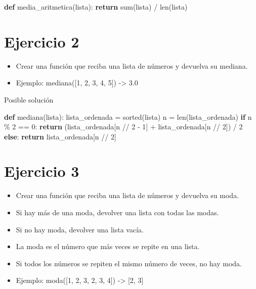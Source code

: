 \documentclass[
  a4paper,
  DIV=11,
  numbers=noendperiod,
  onepage,
  openany]{scrreprt}
\newenvironment{Shaded}{\begin{snugshade}}{\end{snugshade}}
\newcommand{\BuiltInTok}[1]{\textcolor[rgb]{0.00,0.23,0.31}{#1}}
\newcommand{\ControlFlowTok}[1]{\textcolor[rgb]{0.00,0.23,0.31}{\textbf{#1}}}
\newcommand{\DecValTok}[1]{\textcolor[rgb]{0.68,0.00,0.00}{#1}}
\newcommand{\KeywordTok}[1]{\textcolor[rgb]{0.00,0.23,0.31}{\textbf{#1}}}
\newcommand{\NormalTok}[1]{\textcolor[rgb]{0.00,0.23,0.31}{#1}}
\newcommand{\OperatorTok}[1]{\textcolor[rgb]{0.37,0.37,0.37}{#1}}
\providecommand{\tightlist}{%
  \setlength{\itemsep}{0pt}\setlength{\parskip}{0pt}}\usepackage{longtable,booktabs,array}
\begin{document}
\begin{tcolorbox}
\begin{Shaded}
\begin{Highlighting}[]
\KeywordTok{def}\NormalTok{ media\_aritmetica(lista):}
    \ControlFlowTok{return} \BuiltInTok{sum}\NormalTok{(lista) }\OperatorTok{/} \BuiltInTok{len}\NormalTok{(lista)}
\end{Highlighting}
\end{Shaded}

\section{Ejercicio 2}\label{ejercicio-2-2}

\begin{itemize}
\tightlist
\item
  Crear una función que reciba una lista de números y devuelva su
  mediana.
\item
  Ejemplo: mediana({[}1, 2, 3, 4, 5{]}) -\textgreater{} 3.0
\end{itemize}

Posible solución

\begin{Shaded}
\begin{Highlighting}[]
\KeywordTok{def}\NormalTok{ mediana(lista):}
\NormalTok{    lista\_ordenada }\OperatorTok{=} \BuiltInTok{sorted}\NormalTok{(lista)}
\NormalTok{    n }\OperatorTok{=} \BuiltInTok{len}\NormalTok{(lista\_ordenada)}
    \ControlFlowTok{if}\NormalTok{ n }\OperatorTok{\%} \DecValTok{2} \OperatorTok{==} \DecValTok{0}\NormalTok{:}
        \ControlFlowTok{return}\NormalTok{ (lista\_ordenada[n }\OperatorTok{//} \DecValTok{2} \OperatorTok{{-}} \DecValTok{1}\NormalTok{] }\OperatorTok{+}\NormalTok{ lista\_ordenada[n }\OperatorTok{//} \DecValTok{2}\NormalTok{]) }\OperatorTok{/} \DecValTok{2}
    \ControlFlowTok{else}\NormalTok{:}
        \ControlFlowTok{return}\NormalTok{ lista\_ordenada[n }\OperatorTok{//} \DecValTok{2}\NormalTok{]}
\end{Highlighting}
\end{Shaded}

\section{Ejercicio 3}\label{ejercicio-3-2}

\begin{itemize}
\tightlist
\item
  Crear una función que reciba una lista de números y devuelva su moda.
\item
  Si hay más de una moda, devolver una lista con todas las modas.
\item
  Si no hay moda, devolver una lista vacía.
\item
  La moda es el número que más veces se repite en una lista.
\item
  Si todos los números se repiten el mismo número de veces, no hay moda.
\item
  Ejemplo: moda({[}1, 2, 3, 2, 3, 4{]}) -\textgreater{} {[}2, 3{]}
\end{itemize}


\end{tcolorbox}
\end{document}
